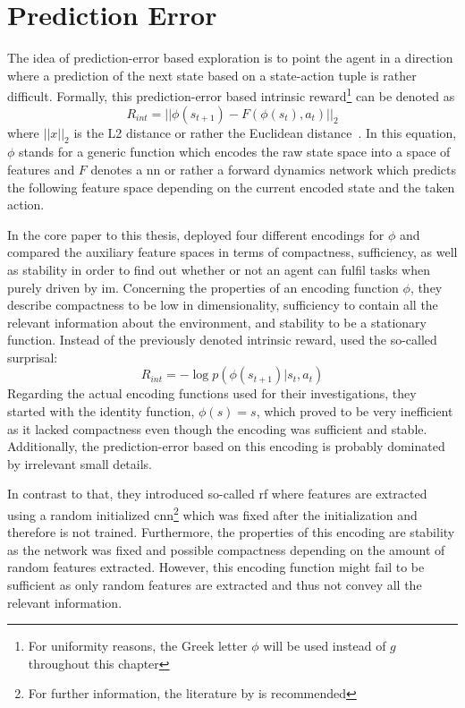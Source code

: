 \documentclass[draft,final]{vutinfth} %
\newcommand{\p}[1]{see p. #1}
\begin{document}
    \section{Prediction Error}\label{sec:prediction-error}

    The idea of prediction-error based exploration is to point the agent in a direction where a prediction of the next state based on a state-action tuple is rather difficult.
    Formally, this prediction-error based intrinsic reward\footnote{For uniformity reasons, the Greek letter $\phi$ will be used instead of $g$ throughout this chapter} can be denoted as
    \begin{equation}
        R_{int}=||\phi(s_{t+1})-F(\phi(s_t),a_t)||_2
    \end{equation}
    where $||x||_2$ is the L2 distance or rather the Euclidean distance~\citep{aubret_survey_2019}.
    In this equation, $\phi$ stands for a generic function which encodes the raw state space into a space of features and $F$ denotes a \gls{nn} or rather a forward dynamics network which predicts the following feature space depending on the current encoded state and the taken action.

    In the core paper to this thesis, \citeauthor{burda_large-scale_2018-1} deployed four different encodings for $\phi$ and compared the auxiliary feature spaces in terms of compactness, sufficiency, as well as stability in order to find out whether or not an agent can fulfil tasks when purely driven by \gls{im}.
    Concerning the properties of an encoding function $\phi$, they describe compactness to be low in dimensionality, sufficiency to contain all the relevant information about the environment, and stability to be a stationary function.
    Instead of the previously denoted intrinsic reward, \citeauthor{burda_large-scale_2018-1} used the so-called surprisal:
    \begin{equation}
        R_{int}=-\log p(\phi(s_{t+1})|s_t,a_t)
    \end{equation}
    Regarding the actual encoding functions used for their investigations, they started with the identity function, $\phi(s)=s$, which proved to be very inefficient as it lacked compactness even though the encoding was sufficient and stable.
    Additionally, the prediction-error based on this encoding is probably dominated by irrelevant small details.

    In contrast to that, they introduced so-called \gls{rf} where features are extracted using a random initialized \gls{cnn}\footnote{For further information, the literature by \citet[\p{40ff}]{aggarwal_neural_2018} is recommended} which was fixed after the initialization and therefore is not trained.
    Furthermore, the properties of this encoding are stability as the network was fixed and possible compactness depending on the amount of random features extracted.
    However, this encoding function might fail to be sufficient as only random features are extracted and thus not convey all the relevant information.
\end{document}
